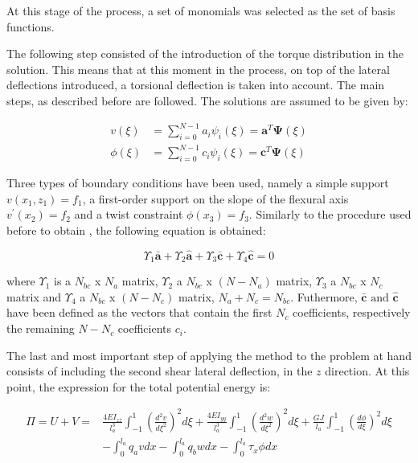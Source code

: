 At this stage of the process, a set of monomials was selected as the set of basis functions.

The following step consisted of the introduction of the torque distribution in the solution. This means that at this moment in the process, on top of the lateral deflections introduced, a torsional deflection is taken into account. The main steps, as described before are followed. The solutions are assumed to be given by:

\begin{equation}
    \begin{aligned}
v(\xi) &=\sum_{i=0}^{N-1} a_{i} \psi_{i}(\xi)=\mathbf{a}^{T} \mathbf{\Psi}(\xi) \\
\phi(\xi) &=\sum_{i=0}^{N-1} c_{i} \psi_{i}(\xi)=\mathbf{c}^{T} \mathbf{\Psi}(\xi)
\end{aligned}
\end{equation}


Three types of boundary conditions have been used, namely a simple support $v(x_1,z_1) = f_1$, a first-order support on the slope of the flexural axis $v^{\prime}(x_2)=f_2$ and a twist constraint $\phi(x_3)=f_3$. Similarly to the procedure used before to obtain , the following equation is obtained:

\begin{equation}
\label{eq:new_form_of_BC_torsion}
    \Upsilon_{1} \mathbf{\bar{a}}+\Upsilon_{2} \mathbf{\hat{a}}+\Upsilon_{3} \mathbf{\bar{c}}+\Upsilon_{4} \mathbf{\hat{c}}=0
\end{equation}

where $\Upsilon_{1}$ is a $N_{bc}$ x $N_a$ matrix, $\Upsilon_{2}$ a $N_{bc}$ x $(N - N_a)$ matrix, $\Upsilon_{3}$ a $N_{bc}$ x $N_c$ matrix and $\Upsilon_{4}$ a $N_{bc}$ x $(N - N_c)$ matrix, $N_a + N_c=N_{bc}$. Futhermore, $\mathbf{\bar{c}} \text{ and } \mathbf{\hat{c}}$ have been defined as the vectors that contain the first $N_c$ coefficients, respectively the remaining $N-N_c$ coefficients $c_i$. 

The last and most important step of applying the method to the problem at hand consists of including the second shear lateral deflection, in the $z$ direction. At this point, the expression for the total potential energy is:

\begin{equation}
    \label{eq:total_potential_energy_final}
    \begin{aligned}
\Pi=U+V=& \frac{4 E I_{z z}}{l_{a}^{3}} \int_{-1}^{1}\left(\frac{d^{2} v}{d \xi^{2}}\right)^{2} d \xi+\frac{4 E I_{y y}}{l_{a}^{3}} \int_{-1}^{1}\left(\frac{d^{2} w}{d \xi^{2}}\right)^{2} d \xi+\frac{G J}{l_{a}} \int_{-1}^{1}\left(\frac{d \phi}{d \xi}\right)^{2} d \xi \\
&-\int_{0}^{l_{a}} q_{a} v d x-\int_{0}^{l_{a}} q_{b} w d x-\int_{0}^{l_{a}} \tau_{x} \phi d x
\end{aligned}
\end{equation}


